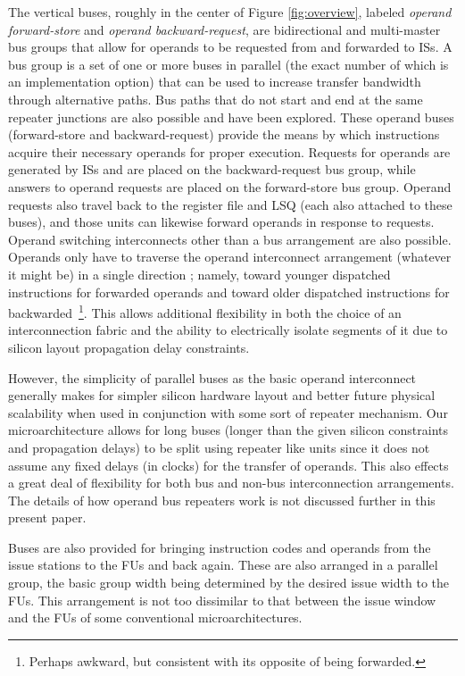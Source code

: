 \documentclass[10pt,dvips]{article}
\begin{document}
The vertical buses, roughly in the center of Figure \ref{fig:overview},
labeled \textit{operand forward-store} and
\textit{operand backward-request}, are
bidirectional and multi-master bus groups that
allow for operands to be requested from and forwarded to
ISs.
A bus group is a set of one or more buses in parallel 
(the exact number of which is an
implementation option) that
can be used to increase transfer bandwidth through alternative paths.
Bus paths that do not start and end at the same repeater junctions
are also possible and have been explored.
These operand buses (forward-store and backward-request) provide
the means by which instructions acquire their necessary
operands for proper execution.
Requests for operands are generated by ISs and
are placed on the backward-request bus group,
while answers to operand requests are placed on the forward-store bus
group.
Operand requests also travel back
to the register file and LSQ (each also attached to these buses), 
and those units
can likewise forward operands in response to requests.
Operand switching interconnects other than
a bus arrangement are also possible.  
Operands only have
to traverse the operand interconnect arrangement (whatever it might be) in
a single direction ; namely, toward younger dispatched instructions for
forwarded operands and 
toward older dispatched instructions for 
backwarded~\footnote{Perhaps awkward, but consistent with its
opposite of being forwarded.}.
This allows additional flexibility in both the choice of an interconnection
fabric and the ability to electrically isolate segments of
it due to silicon layout propagation delay constraints.

However, 
the simplicity of parallel buses as the basic operand interconnect
generally makes for simpler silicon hardware layout
and better future physical scalability when used in conjunction
with some sort of repeater mechanism.
Our microarchitecture allows for long buses
(longer than the given silicon constraints and propagation
delays) to be split using repeater like units since it
does not assume any fixed delays (in clocks)
for the transfer of operands.  This also effects a great deal of 
flexibility for
both bus and non-bus interconnection arrangements.
The details of how operand bus repeaters work is not discussed
further in this present paper.

Buses are also provided 
for bringing instruction codes and operands from the issue
stations to the FUs and back again.
These are also arranged in a parallel group, the basic group width being
determined by the desired issue width to the FUs.
This arrangement is not too dissimilar to that between the issue window
and the FUs of some conventional microarchitectures.
\end{document}
